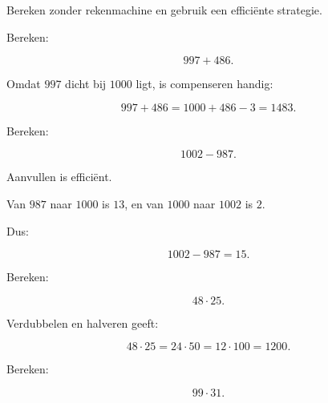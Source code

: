 \documentclass{ximera}
\begin{document}
\begin{oefening}{\oefU\ESS}

Bereken zonder rekenmachine en gebruik een efficiënte strategie.

\begin{question}

Bereken:

\[
997+486.
\]

\begin{oplossing}

Omdat \(997\) dicht bij \(1000\) ligt, is compenseren handig:

\[
997+486
=
1000+486-3
=
1483.
\]

\end{oplossing}

\end{question}


\begin{question}

Bereken:

\[
1002-987.
\]

\begin{oplossing}

Aanvullen is efficiënt.

Van \(987\) naar \(1000\) is \(13\), en van \(1000\) naar \(1002\) is \(2\).

Dus:

\[
1002-987=15.
\]

\end{oplossing}

\end{question}


\begin{question}

Bereken:

\[
48\cdot25.
\]

\begin{oplossing}

Verdubbelen en halveren geeft:

\[
48\cdot25
=
24\cdot50
=
12\cdot100
=
1200.
\]

\end{oplossing}

\end{question}


\begin{question}

Bereken:

\[
99\cdot31.
\]

\begin{oplossing}


\end{oplossing}
\end{question}
\end{oefening}
\end{document}
